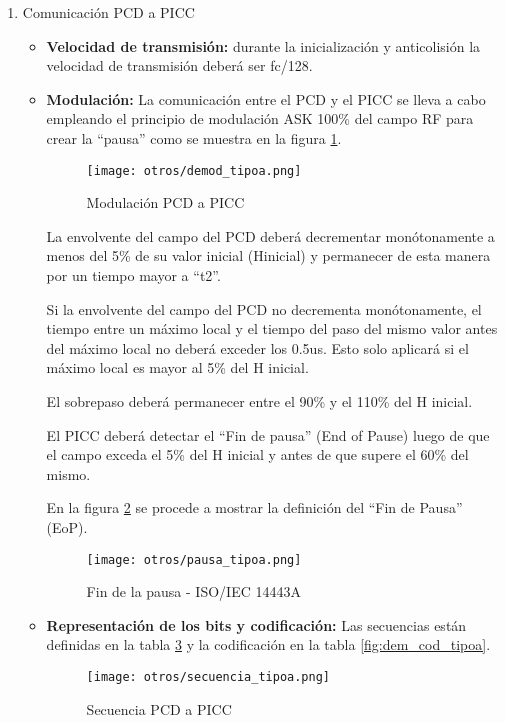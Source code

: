 \begin{enumerate}
\item Comunicación PCD a PICC
\begin{itemize}
\item \textbf{Velocidad de transmisión:} durante la inicialización y anticolisión la velocidad de transmisión deberá ser fc/128.
\item \textbf{Modulación:} La comunicación entre el PCD y el PICC se lleva a cabo empleando el principio de modulación ASK 100\% del campo RF para crear la “pausa” como se muestra en la figura \ref{fig:demod_tipoa}.

\begin{figure}[H]
\centering
\texttt{[image: otros/demod\_tipoa.png]}
\caption{Modulación PCD a PICC}
\label{fig:demod_tipoa}
\end{figure}

La envolvente del campo del PCD deberá decrementar monótonamente a menos del 5\% de su valor inicial (Hinicial) y permanecer de esta manera por un tiempo mayor a “t2”.

Si la envolvente del campo del PCD no decrementa monótonamente, el tiempo entre un máximo local y el tiempo del paso del mismo valor antes del máximo local no deberá exceder  los 0.5us. Esto solo aplicará si el máximo local es mayor al 5\% del H inicial.

El sobrepaso deberá permanecer entre el 90\% y el 110\% del H inicial.

El PICC deberá detectar el “Fin de pausa” (End of Pause) luego de que el campo exceda el 5\% del H inicial y antes de que supere el 60\% del mismo.

En la figura \ref{fig:pausa_tipoa} se procede a mostrar la definición del “Fin de Pausa” (EoP).

\begin{figure}[H]
\centering
\texttt{[image: otros/pausa\_tipoa.png]}
\caption{Fin de la pausa - ISO/IEC 14443A}
\label{fig:pausa_tipoa}
\end{figure}

\item \textbf{Representación de los bits y codificación:} Las secuencias están definidas en la tabla \ref{fig:code_tipoa} y la codificación en la tabla \ref{fig:dem_cod_tipoa}.

\begin{figure}[H]
\centering
\texttt{[image: otros/secuencia\_tipoa.png]}
\caption{Secuencia PCD a PICC}
\label{fig:code_tipoa}
\end{figure}


\end{itemize}
\end{enumerate}
